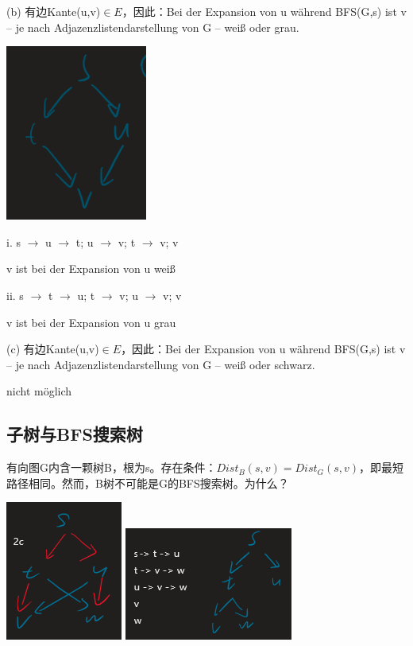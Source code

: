 \documentclass[a4paper]{article}    %
\begin{document}
(b) 有边Kante(u,v)$\in E$，因此：Bei der Expansion von u während BFS(G,s) ist v – je nach Adjazenzlistendarstellung von G – weiß oder grau.

\begin{center}
    \includegraphics[scale=0.6]{4.png}
\end{center}

i. s $\rightarrow$ u $\rightarrow$ t; u $\rightarrow$ v; t $\rightarrow$ v; v

\indent\indent v ist bei der Expansion von u weiß

ii. s $\rightarrow$ t $\rightarrow$ u; t $\rightarrow$ v; u $\rightarrow$ v; v

\indent\indent v ist bei der Expansion von u grau


(c) 有边Kante(u,v)$\in E$，因此：Bei der Expansion von u während BFS(G,s) ist v – je nach Adjazenzlistendarstellung von G – weiß oder schwarz.

nicht möglich

\subsection{子树与BFS搜索树}

有向图G内含一颗树B，根为s。存在条件：$Dist_B(s,v) = Dist_G(s,v)$，即最短路径相同。然而，B树不可能是G的BFS搜索树。为什么？

\begin{center}
    \includegraphics[scale=0.6]{5.png}
    \includegraphics[scale=0.6]{6.png}
\end{center}
\end{document}
